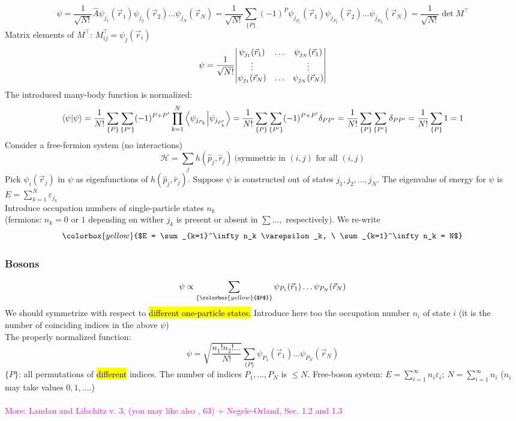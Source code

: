 \documentclass[10pt]{article}
\begin{document}
$$
\psi = \frac{1}{\sqrt{N!}}\hat A \psi_{j_1}(\vec r_1)\psi_{j_2}(\vec r_2)\hdots \psi_{j_N}(\vec r_N) = \frac{1}{\sqrt{N!}}\sum_{\{P\}}(-1)^P \psi_{j_{P_1}}(\vec r_1)\psi_{j_{P_2}}(\vec r_2)\hdots \psi_{j_{P_N}}(\vec r_N) = \frac{1}{\sqrt{N!}}\det M^\top
$$
Matrix elements of $M^\top$: $M^\top_{ij} = \psi_j(\vec r_i)$
$$
\psi = \frac{1}{\sqrt{N!}}\mqty|\psi_{j_1}(\vec r_1) & \hdots & \psi_{j_N}(\vec r_1) \\ \vdots & & \vdots \\ \psi_{j_1}(\vec r_N) & \hdots & \psi_{j_N}(\vec r_N)|
$$
The introduced many-body function is normalized:
$$
\braket{\psi}{\psi} = \frac{1}{N!}\sum_{\{P\}}\sum_{\{P'\}}(-1)^{P+P'}\prod_{k=1}^N\braket{\psi_{j_{P_k}}}{\psi_{j_{P'_k}}} = \frac{1}{N!}\sum_{\{P\}}\sum_{\{P'\}}(-1)^{P+P'}\delta_{PP'} = \frac{1}{N!}\sum_{\{P\}}\sum_{\{P'\}}\delta_{PP'} = \frac{1}{N!}\sum_{\{P\}}1 = 1
$$
Consider a free-fermion system (no interactions) 
$$
\mathcal H = \sum_j h(\hat p_j, \hat r_j) \ \text{(symmetric in $(i,j)$ for all $(i,j)$}
$$
Pick $\psi_i(\vec r_j)$ in $\psi$ as eigenfunctions of $h(\hat p_j, \hat r_j)$. Suppose $\psi$ is constructed out of states $j_1, j_2, \hdots, j_N$. The eigenvalue of energy for $\psi$ is $E = \sum_{k=1}^N \varepsilon_{j_k}$\\
Introduce occupation numbers of single-particle states $n_k$\\
(fermions: $n_k = 0$ or $1$ depending on wither $j_k$ is present or absent in $\sum \hdots,$ respectively). We re-write
$$
\colorbox{yellow}{$E = \sum_{k=1}^\infty n_k \varepsilon_k, \ \sum_{k=1}^\infty n_k = N$}
$$

\subsubsection{Bosons}
$$
\psi \propto \sum_{\{\colorbox{yellow}{$P$}\}} \psi_{P_1}(\vec r_1)\hdots \psi_{P_N}(\vec r_N)
$$
We should symmetrize with respect to \hl{different one-particle states.} Introduce here too the occupation number $n_i$ of state $i$ (it is the number of coinciding indices in the above $\psi$)\\
The properly normalized function:
$$
\psi = \sqrt{\frac{n_1!n_2!...}{N!}} \sum_{\{P\}} \psi_{P_1}(\vec r_1)\hdots \psi_{P_N}(\vec r_N)
$$
$\{P\}$: all permutations of \hl{different} indices. The number of indices $P_1, \hdots, P_N$ is $\leq N$. Free-boson system: $E = \sum_{i=1}^\infty n_i \varepsilon_i; \ N = \sum_{i=1}^\infty n_i$ ($n_i$ may take values $0,1,\hdots$.)\\ \\
\textcolor{magenta}{More: Landau and Lifschitz v. 3, \textsection (you may like also , 63) + Negele-Orland, Sec. 1.2 and 1.3}
\end{document}
